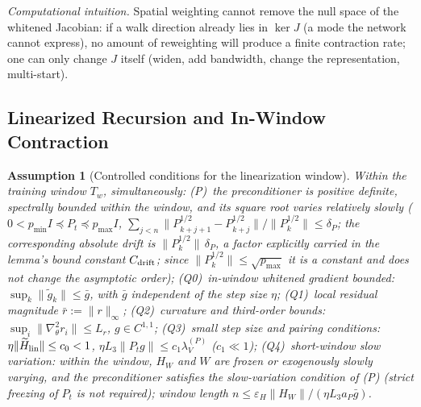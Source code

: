 \documentclass[11pt]{article}
\newcommand{\W}{W}
\newcommand{\wt}[1]{\widetilde{#1}}
\newtheorem{assumption}{Assumption}[section]
\numberwithin{equation}{section}
\begin{document}
\noindent\emph{Computational intuition.} Spatial weighting cannot remove the null space of the whitened Jacobian: if a walk direction already lies in $\ker J$ (a mode the network cannot express), no amount of reweighting will produce a finite contraction rate; one can only change $J$ itself (widen, add bandwidth, change the representation, multi-start).

\subsection{Linearized Recursion and In-Window Contraction}\label{sec:R-linrec}

\begin{assumption}[Controlled conditions for the linearization window]\label{ass:ctrl}
Within the training window $T_w$, simultaneously: (P)~the preconditioner is positive definite, spectrally bounded within the window, and its square root varies \emph{relatively} slowly ($0<p_{\min}I\preceq P_t\preceq p_{\max}I$, $\sum_{j<n}\|P_{k+j+1}^{1/2}-P_{k+j}^{1/2}\|/\|P_k^{1/2}\|\le\delta_P$; the corresponding absolute drift is $\|P_k^{1/2}\|\,\delta_P$, a factor explicitly carried in the lemma's bound constant $C_{\rm drift}$; since $\|P_k^{1/2}\|\le\sqrt{p_{\max}}$ it is a constant and does not change the asymptotic order); (Q0)~in-window whitened gradient bounded: $\sup_k\|\wt g_k\|\le\bar g$, with $\bar g$ independent of the step size $\eta$; (Q1)~local residual magnitude $\bar r:=\|r\|_\infty$; (Q2)~curvature and third-order bounds: $\sup_i\|\nabla_\theta^2r_i\|\le L_r$, $g\in C^{1,1}$; (Q3)~small step size and pairing conditions: $\eta\|\wt H_{\rm lin}\|\le c_0<1$, $\eta L_3\|P_tg\|\le c_1\lambda_V^{(P)}$ ($c_1\ll1$); (Q4)~short-window slow variation: within the window, $H_{\W}$ and $\W$ are frozen or exogenously slowly varying, and the preconditioner satisfies the slow-variation condition of (P) (strict freezing of $P_t$ is not required); window length $n\le\varepsilon_H\|H_{\W}\|/(\eta L_3a_P\bar g)$.
\end{assumption}
\end{document}

